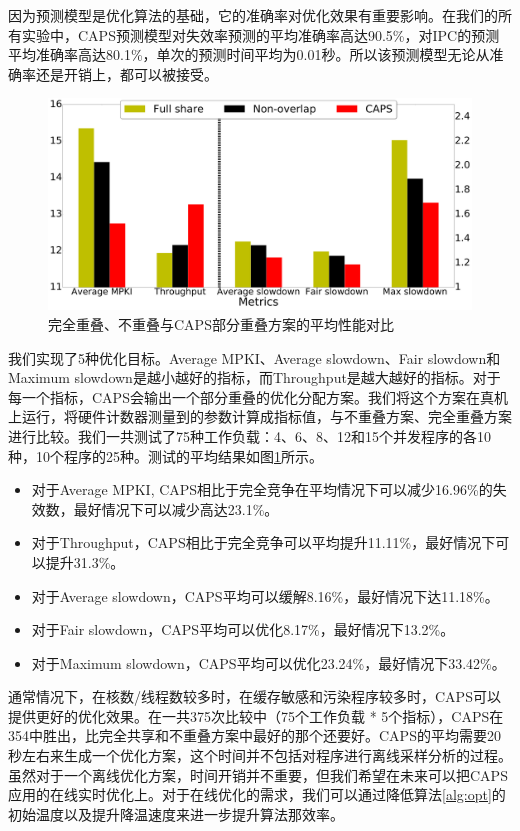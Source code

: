 因为预测模型是优化算法的基础，它的准确率对优化效果有重要影响。在我们的所有实验中，CAPS预测模型对失效率预测的平均准确率高达90.5\%，对IPC的预测平均准确率高达80.1\%，单次的预测时间平均为0.01秒。所以该预测模型无论从准确率还是开销上，都可以被接受。

\begin{figure}[htbp]
\centering
\includegraphics[width=0.9\columnwidth]{figures/avg_analysis.pdf}
\caption{完全重叠、不重叠与CAPS部分重叠方案的平均性能对比}
\label{fig:avg_an}
\end{figure} 

我们实现了5种优化目标。Average MPKI、Average slowdown、Fair slowdown和Maximum slowdown是越小越好的指标，而Throughput是越大越好的指标。对于每一个指标，CAPS会输出一个部分重叠的优化分配方案。我们将这个方案在真机上运行，将硬件计数器测量到的参数计算成指标值，与不重叠方案、完全重叠方案进行比较。我们一共测试了75种工作负载：4、6、8、12和15个并发程序的各10种，10个程序的25种。测试的平均结果如图\ref{fig:avg_an}所示。

\begin{itemize}
    \item 对于Average MPKI, CAPS相比于完全竞争在平均情况下可以减少16.96\%的失效数，最好情况下可以减少高达23.1\%。
    \item 对于Throughput，CAPS相比于完全竞争可以平均提升11.11\%，最好情况下可以提升31.3\%。
    \item 对于Average slowdown，CAPS平均可以缓解8.16\%，最好情况下达11.18\%。
    \item 对于Fair slowdown，CAPS平均可以优化8.17\%，最好情况下13.2\%。
    \item 对于Maximum slowdown，CAPS平均可以优化23.24\%，最好情况下33.42\%。
\end{itemize}

通常情况下，在核数/线程数较多时，在缓存敏感和污染程序较多时，CAPS可以提供更好的优化效果。在一共375次比较中（75个工作负载 * 5个指标），CAPS在354中胜出，比完全共享和不重叠方案中最好的那个还要好。CAPS的平均需要20秒左右来生成一个优化方案，这个时间并不包括对程序进行离线采样分析的过程。虽然对于一个离线优化方案，时间开销并不重要，但我们希望在未来可以把CAPS应用的在线实时优化上。对于在线优化的需求，我们可以通过降低算法\ref{alg:opt}的初始温度以及提升降温速度来进一步提升算法那效率。


